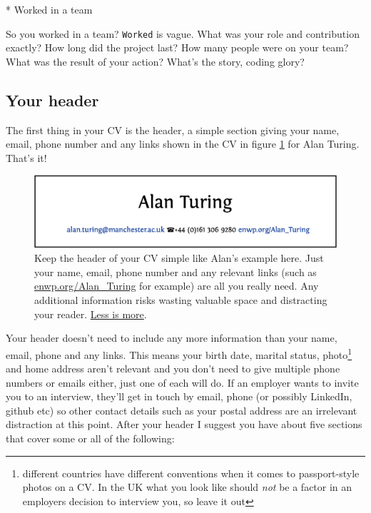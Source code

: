 \documentclass[
]{book}
\newenvironment{Shaded}{\begin{snugshade}}{\end{snugshade}}
\newcommand{\NormalTok}[1]{#1}
\newcommand{\SpecialStringTok}[1]{\textcolor[rgb]{0.31,0.60,0.02}{#1}}
\begin{document}
\begin{Shaded}
\begin{Highlighting}[]
\SpecialStringTok{* }\NormalTok{Worked in a team}
\end{Highlighting}
\end{Shaded}

So you worked in a team? \texttt{Worked} is vague. What was your role and contribution exactly? How long did the project last? How many people were on your team? What was the result of your action? What's the story, coding glory? \citep{whatsthestory}

\hypertarget{mycvpd}{%
\subsection{Your header}\label{mycvpd}}

The first thing in your CV is the header, a simple section giving your name, email, phone number and any links shown in the CV in figure \ref{fig:turinghead-fig} for Alan Turing. That's it!

\begin{figure}

{\centering \includegraphics[width=0.98\linewidth]{images/alan-turing-header} 

}

\caption{Keep the header of your CV simple like Alan's example here. Just your name, email, phone number and any relevant links (such as \href{https://enwp.org/Alan_Turing}{enwp.org/Alan\_Turing} for example) are all you really need. Any additional information risks wasting valuable space and distracting your reader. \href{https://en.wikipedia.org/wiki/Less_(Unix)}{Less is more}.}\label{fig:turinghead-fig}
\end{figure}



Your header doesn't need to include any more information than your name, email, phone and any links. This means your birth date, marital status, photo\footnote{different countries have different conventions when it comes to passport-style photos on a CV. In the UK what you look like should \emph{not} be a factor in an employers decision to interview you, so leave it out} and home address aren't relevant and you don't need to give multiple phone numbers or emails either, just one of each will do. If an employer wants to invite you to an interview, they'll get in touch by email, phone (or possibly LinkedIn, github etc) so other contact details such as your postal address are an irrelevant distraction at this point. After your header I suggest you have about five sections that cover some or all of the following:
\end{document}
